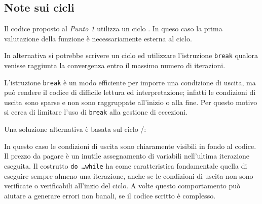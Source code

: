 \subsection*{Note sui cicli}

Il codice proposto al \emph{Punto 1} utilizza un ciclo .
%
In queso caso la prima valutazione della funzione \`e necessariamente esterna
al ciclo.

In alternativa si potrebbe scrivere un ciclo  ed utilizzare
l'istruzione \texttt{break} qualora venisse raggiunta la convergenza entro
il massimo numero di iterazioni.
\lstset{basicstyle=\scriptsize\sf}
    
\lstset{basicstyle=\sf}
L'istruzione \texttt{break} \`e un modo efficiente per
imporre una condizione di uscita, ma pu\`o rendere il codice di difficile
lettura ed interpretazione; infatti le condizioni di uscita sono sparse e non
sono raggruppate all'inizio o alla fine. Per questo motivo si cerca di limitare
l'uso di \texttt{break} alla gestione di eccezioni.

Una soluzione alternativa \`e basata sul ciclo /:
\lstset{basicstyle=\scriptsize\sf}

\lstset{basicstyle=\sf}
In questo caso le condizioni di uscita sono chiaramente visibili in fondo al
codice. Il prezzo da pagare \`e un inutile assegnamento di variabili
nell'ultima iterazione eseguita. Il costrutto \texttt{do \ldots while} ha come
caratteristica fondamentale quella di eseguire sempre almeno una iterazione,
anche se le condizioni di uscita non sono verificate o
verificabili all'inzio del ciclo.
A volte questo comportamento pu\`o aiutare a generare errori non banali,
se il codice scritto \`e complesso.

